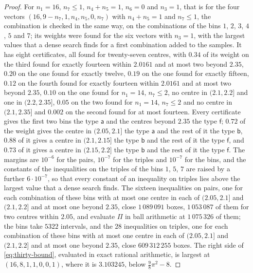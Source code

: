 \documentclass[11pt,reqno]{amsart}
\renewcommand{\_}{\origunderscore\allowbreak}
\numberwithin{equation}{section}
\theoremstyle{plain}
\theoremstyle{definition}
\theoremstyle{remark}
\begin{document}
\begin{proof}
For $n_1=16$, $n_7\le1$, $n_4+n_5=1$, $n_6=0$ and $n_3=1$, that is for
the four vectors $(16,9-n_7,1,n_4,n_5,0,n_7)$ with $n_4+n_5=1$ and
$n_7\le1$, the combination is checked in the same way, on the combinations
of the bins $1$, $2$, $3$, $4$, $5$ and $7$; its weights were found for the
six vectors with $n_3=1$, with the largest values that a dense search finds
for a first combination added to the samples. It has eight certificates,
all found for twenty-seven centres, with $0.34$ of its weight on the third
found for exactly fourteen within $2.0161$ and at most two beyond $2.35$,
$0.20$ on the one found for exactly twelve, $0.19$ on the one found for
exactly fifteen, $0.12$ on the fourth found for exactly fourteen within
$2.0161$ and at most two beyond $2.35$, $0.10$ on the one found for
$n_1=14$, $n_7\le2$, no centre in $(2.1,2.2]$ and one in $(2.2,2.35]$,
$0.05$ on the two found for $n_1=14$, $n_7\le2$ and no centre in
$(2.1,2.35]$ and $0.002$ on the second found for at most fourteen. Every
certificate gives the first two bins the type $\mathsf a$ and the centres
beyond $2.35$ the type $\mathsf f$; $0.72$ of the weight gives the centre
in $(2.05,2.1]$ the type $\mathsf a$ and the rest of it the type
$\mathsf b$, $0.88$ of it gives a centre in $(2.1,2.15]$ the type
$\mathsf b$ and the rest of it the type $\mathsf f$, and $0.73$ of it gives
a centre in $(2.15,2.2]$ the type $\mathsf b$ and the rest of it the type
$\mathsf f$. The margins are $10^{-6}$ for the pairs, $10^{-7}$ for the
triples and $10^{-7}$ for the bins, and the constants of the inequalities
on the triples of the bins $1$, $5$, $7$ are raised by a further
$6\cdot10^{-7}$, so that every constant of an inequality on triples lies
above the largest value that a dense search finds. The sixteen
inequalities on pairs, one for each combination of these bins with at most
one centre in each of $(2.05,2.1]$ and $(2.1,2.2]$ and at most one beyond
$2.35$, close $1\,089\,091$ boxes, $1\,053\,087$ of them for two centres
within $2.05$, and evaluate $\Pi$ in ball arithmetic at $1\,075\,326$ of
them; the bins take $5322$ intervals, and the $28$ inequalities on
triples, one for each combination of these bins with at most one centre in
each of $(2.05,2.1]$ and $(2.1,2.2]$ and at most one beyond $2.35$, close
$609\,312\,255$ boxes. The right side of \eqref{eq:thirty-bound},
evaluated in exact rational arithmetic, is largest at $(16,8,1,1,0,0,1)$,
where it is $3.103245$, below $\frac98\pi^2-8$.


\end{proof}
\end{document}
